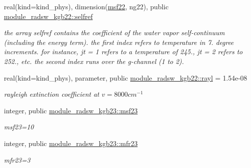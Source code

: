 \begin{DoxyCompactItemize}
\mbox{\label{group__module__radsw__kgbnn_gabc3bd99e8ad7d1f09fb7fab7ed67a32b}} 
real(kind=kind\+\_\+phys), dimension(\hyperlink{group__module__radsw__kgbnn_ga0903a020c9e4a4f7c21911d2ab98fd46}{msf22}, ng22), public \hyperlink{group__module__radsw__kgbnn_gabc3bd99e8ad7d1f09fb7fab7ed67a32b}{module\+\_\+radsw\+\_\+kgb22\+::selfref}
\begin{DoxyCompactList}\small\item\em the array selfref contains the coefficient of the water vapor self-\/continuum (including the energy term). the first index refers to temperature in 7. degree increments. for instance, jt = 1 refers to a temperature of 245., jt = 2 refers to 252., etc. the second index runs over the g-\/channel (1 to 2). \end{DoxyCompactList}\item 
\mbox{\label{group__module__radsw__kgbnn_gae77b766677ea476e2ba14b88e511870a}} 
real(kind=kind\+\_\+phys), parameter, public \hyperlink{group__module__radsw__kgbnn_gae77b766677ea476e2ba14b88e511870a}{module\+\_\+radsw\+\_\+kgb22\+::rayl} = 1.\+54e-\/08
\begin{DoxyCompactList}\small\item\em rayleigh extinction coefficient at $v=8000cm^{-1}$ \end{DoxyCompactList}\item 
\mbox{\label{group__module__radsw__kgbnn_gab96959c26232963a568609451483843e}} 
integer, public \hyperlink{group__module__radsw__kgbnn_gab96959c26232963a568609451483843e}{module\+\_\+radsw\+\_\+kgb23\+::msf23}
\begin{DoxyCompactList}\small\item\em msf23=10 \end{DoxyCompactList}\item 
\mbox{\label{group__module__radsw__kgbnn_ga78b43ec4bc2afd4f520480a8410d9df5}} 
integer, public \hyperlink{group__module__radsw__kgbnn_ga78b43ec4bc2afd4f520480a8410d9df5}{module\+\_\+radsw\+\_\+kgb23\+::mfr23}
\begin{DoxyCompactList}\small\item\em mfr23=3 \end{DoxyCompactList}\item 
\mbox{\label{group__module__radsw__kgbnn_ga18fabad311919ee30b2d367fbe250bcc}} 

\end{DoxyCompactItemize}
